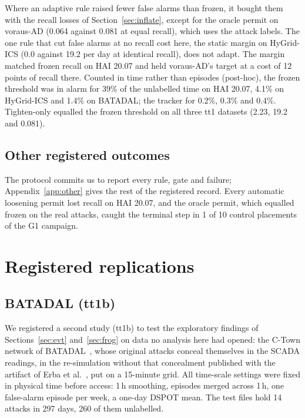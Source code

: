 \documentclass[letterpaper,twocolumn,10pt]{article}
\begin{document}
Where an adaptive rule raised fewer false alarms than frozen, it bought them with the recall losses of Section~\ref{sec:inflate}, except for the oracle permit on voraus-AD (0.064 against 0.081 at equal recall), which uses the attack labels. The one rule that cut false alarms at no recall cost here, the static
margin on HyGrid-ICS (0.0 against 19.2 per day at identical recall), does not adapt. The margin
matched frozen recall on HAI 20.07 and held voraus-AD's target at a cost of 12 points of recall
there. Counted in time rather than episodes (post-hoc), the frozen threshold was in alarm for 39\% of
the unlabelled time on HAI 20.07, 4.1\% on HyGrid-ICS and 1.4\% on BATADAL; the tracker for 0.2\%, 0.3\%
and 0.4\%. Tighten-only equalled the frozen threshold on all three tt1 datasets (2.23, 19.2 and 0.081).

\subsection{Other registered outcomes}
\label{sec:other}

The protocol commits us to report every rule, gate and failure; Appendix~\ref{app:other} gives the rest
of the registered record. Every automatic loosening permit lost recall on HAI 20.07, and the oracle
permit, which equalled frozen on the real attacks, caught the terminal step in 1 of 10 control
placements of the G1 campaign.

\section{Registered replications}
\label{sec:replications}

\subsection{BATADAL (tt1b)}
\label{sec:batadal}

We registered a second study (tt1b) to test the exploratory findings of Sections~\ref{sec:evt}
and~\ref{sec:frog} on data no analysis here had opened: the C-Town network of
BATADAL~\cite{taormina2018batadal}, whose original attacks conceal themselves in the SCADA readings,
in the re-simulation without that concealment published with the artifact of Erba
et al.~\cite{erba2020concealment}, put on a 15-minute grid. All time-scale settings were fixed in
physical time before access: 1\,h smoothing, episodes merged across 1\,h, one false-alarm episode per
week, a one-day DSPOT mean. The test files hold 14 attacks in 297 days, 260 of them unlabelled.
\end{document}
